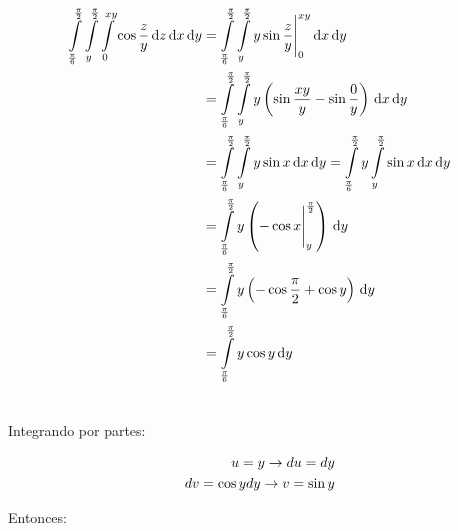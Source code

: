 \documentclass[11pt]{report}
\begin{document}
\begin{align*}
        \int \limits_{\frac{\pi}{6}}^{\frac{\pi}{2}}
        \int \limits_{y}^{\frac{\pi}{2}}
        \int \limits_0^{xy} \cos{\frac{z}{y}} \, \text dz \, \text dx \, \text dy
        &=
        \int \limits_{\frac{\pi}{6}}^{\frac{\pi}{2}}
        \int \limits_{y}^{\frac{\pi}{2}}
        y \sin{\frac{z}{y}} \Bigg|_0^{xy}  \, \text dx \, \text dy \\ \notag
        &=
        \int \limits_{\frac{\pi}{6}}^{\frac{\pi}{2}}
        \int \limits_{y}^{\frac{\pi}{2}}
        y \left( \sin{\frac{xy}{y}} - \sin{\frac{0}{y}} \right) \, \text dx \, \text dy \\ \notag
        &=
        \int \limits_{\frac{\pi}{6}}^{\frac{\pi}{2}}
        \int \limits_{y}^{\frac{\pi}{2}}
        y \sin{x} \, \text dx \, \text dy
        =
        \int \limits_{\frac{\pi}{6}}^{\frac{\pi}{2}} y
        \int \limits_{y}^{\frac{\pi}{2}}
        \sin{x} \, \text dx \, \text dy \\ \notag
        &=
        \int \limits_{\frac{\pi}{6}}^{\frac{\pi}{2}} y
        \left(-\cos{x} \Bigg|_y^{\frac{\pi}{2}} \right) \, \text dy \\ \notag
        &=
        \int \limits_{\frac{\pi}{6}}^{\frac{\pi}{2}} y
        \left(-\cos{\frac{\pi}{2}} + \cos{y} \right) \, \text dy \\ \notag
        &=
        \int \limits_{\frac{\pi}{6}}^{\frac{\pi}{2}} y
        \cos{y} \, \text dy \\ \notag
\end{align*}

Integrando por partes:

\begin{align*}
        u = y \rightarrow du = dy \\ \notag
        dv = \cos{y} dy \rightarrow v = \sin{y}
\end{align*}

Entonces:
\end{document}

